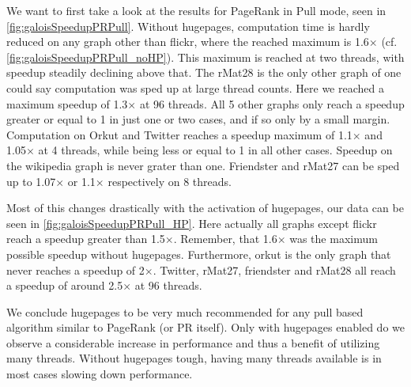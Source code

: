 We want to first take a look at the results for PageRank in Pull mode, seen in \autoref{fig:galoisSpeedupPRPull}. Without hugepages, computation time is hardly reduced on any graph other than flickr, where the reached maximum is 1.6$\times$ (cf. \autoref{fig:galoisSpeedupPRPull_noHP}). This maximum is reached at two threads, with speedup steadily declining above that.
The rMat28 is the only other graph of one could say computation was sped up at large thread counts. Here we reached a maximum speedup of 1.3$\times$ at 96 threads.
All 5 other graphs only reach a speedup greater or equal to 1 in just one or two cases, and if so only by a small margin.
Computation on Orkut and Twitter reaches a speedup maximum of 1.1$\times$ and 1.05$\times$ at 4 threads, while being less or equal to 1 in all other cases.
Speedup on the wikipedia graph is never grater than one.
Friendster and rMat27 can be sped up to 1.07$\times$ or 1.1$\times$ respectively on 8 threads.

Most of this changes drastically with the activation of hugepages, our data can be seen in \autoref{fig:galoisSpeedupPRPull_HP}. 
Here actually all graphs except flickr reach a speedup greater than 1.5$\times$. Remember, that 1.6$\times$ was the maximum possible speedup without hugepages.
Furthermore, orkut is the only graph that never reaches a speedup of 2$\times$.
Twitter, rMat27, friendster and rMat28 all reach a speedup of around 2.5$\times$ at 96 threads.

We conclude hugepages to be very much recommended for any pull based algorithm similar to PageRank (or PR itself).
Only with hugepages enabled do we observe a considerable increase in performance and thus a benefit of utilizing many threads.
Without hugepages tough, having many threads available is in most cases slowing down performance.


